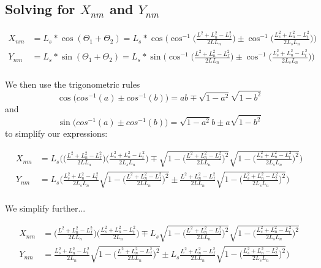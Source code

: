 \documentclass[11pt, landscape]{article}
\begin{document}
\subsection{Solving for $X_{nm}$ and $Y_{nm}$}

\begin{align}
  X_{nm} &= L_{s}*\cos(\Theta_{1}+\Theta_{2}) =
     L_{s}*\cos\Bigg(\cos^{-1}\bigg(\frac{L^2+L_{n}^2-L_{f}^2}{2LL_{n}}\bigg)
     \pm \cos^{-1}\bigg(\frac{L_{s}^2+L_{n}^2-L_{t}^2}{2L_{s}L_{n}}\bigg)\Bigg) \\
  Y_{nm} &= L_{s}*\sin(\Theta_{1}+\Theta_{2}) =
     L_{s}*\sin\Bigg(\cos^{-1}\bigg(\frac{L^2+L_{n}^2-L_{f}^2}{2LL_{n}}\bigg)
     \pm \cos^{-1}\bigg(\frac{L_{s}^2+L_{n}^2-L_{t}^2}{2L_{s}L_{n}}\bigg)\Bigg) \\
\end{align}

We then use the trigonometric rules $$\cos\Big(cos^{-1}(a)\pm
cos^{-1}(b)\Big) = ab \mp \sqrt{1-a^2}\sqrt{1-b^2}$$
and $$\sin\Big(cos^{-1}(a)\pm cos^{-1}(b)\Big) = \sqrt{1-a^2}b\pm a\sqrt{1-b^2}$$ to simplify our expressions:

\begin{align}
  X_{nm} &= L_{s}\Bigg( \Big(\frac{L^2+L_{n}^2-L_{f}^2}{2LL_{n}}\Big)\Big(\frac{L_{s}^2+L_{n}^2-L_{t}^2}{2L_{s}L_{n}}\Big) \mp \sqrt{1-\bigg(\frac{L^2+L_{n}^2-L_{f}^2}{2LL_{n}}\bigg)^2}\sqrt{1-\bigg(\frac{L_{s}^2+L_{n}^2-L_{t}^2}{2L_{s}L_{n}}\bigg)^2} \Bigg)\\
  Y_{nm} &= L_{s}\Bigg(\frac{L_{s}^2+L_{n}^2-L_{t}^2}{2L_{s}L_{n}}\sqrt{1-\bigg(\frac{L^2+L_{n}^2-L_{f}^2}{2LL_{n}}\bigg)^2} \pm \frac{L^2+L_{n}^2-L_{f}^2}{2LL_{n}}\sqrt{1-\bigg(\frac{L_{s}^2+L_{n}^2-L_{t}^2}{2L_{s}L_{n}}\bigg)^2} \Bigg)\\
\end{align}

We simplify further...

\begin{align}
  X_{nm} &= \Big(\frac{L^2+L_{n}^2-L_{f}^2}{2LL_{n}}\Big)\Big(\frac{L_{s}^2+L_{n}^2-L_{t}^2}{2L_{n}}\Big) \mp L_s\sqrt{1-\bigg(\frac{L^2+L_{n}^2-L_{f}^2}{2LL_{n}}\bigg)^2}\sqrt{1-\bigg(\frac{L_{s}^2+L_{n}^2-L_{t}^2}{2L_{s}L_{n}}\bigg)^2}\\
  Y_{nm} &= \frac{L_{s}^2+L_{n}^2-L_{t}^2}{2L_{n}}\sqrt{1-\bigg(\frac{L^2+L_{n}^2-L_{f}^2}{2LL_{n}}\bigg)^2} \pm L_s\frac{L^2+L_{n}^2-L_{f}^2}{2LL_{n}}\sqrt{1-\bigg(\frac{L_{s}^2+L_{n}^2-L_{t}^2}{2L_{s}L_{n}}\bigg)^2} \Bigg)\\
\end{align}
\end{document}
